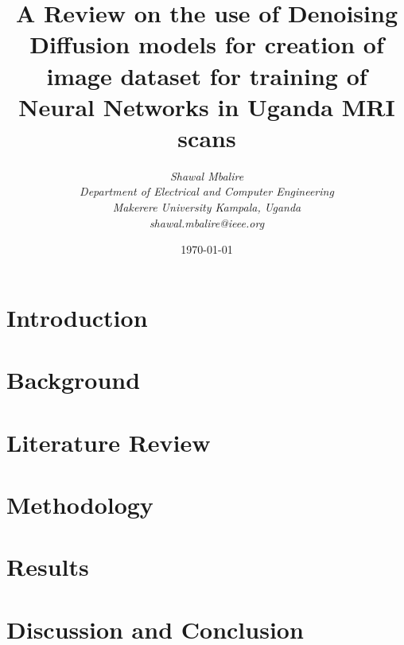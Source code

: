 \documentclass{IEEEtran}
\title{A Review on the use of Denoising Diffusion models for creation of image dataset for training of Neural Networks in Uganda MRI scans}
\author{
    \textit{Shawal Mbalire} \\
    \textit{Department of Electrical and Computer Engineering} \\
    \textit{Makerere University Kampala, Uganda} \\
    \textit{shawal.mbalire@ieee.org}
}
\date{\today}
\begin{document}
    \maketitle
    
    \section{Introduction}\label{sec:introduction}
    
    \section{Background}\label{sec:background}
    
    \section{Literature Review}\label{sec:literature}
    
    \section{Methodology}\label{sec:methodology}
    
    \section{Results}\label{sec:results}
    
    \section{Discussion and Conclusion}\label{sec:conclusion}
    
    
    
\end{document}
